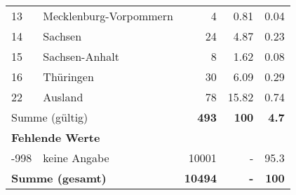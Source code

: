 \begin{longtable}{lXrrr}
     13 &
     \multicolumn{1}{X}{ Mecklenburg-Vorpommern   } &


       \num{4} &
       \num[round-mode=places,round-precision=2]{0.81} &
         \num[round-mode=places,round-precision=2]{0.04} \\

     14 &
     \multicolumn{1}{X}{ Sachsen   } &


       \num{24} &
       \num[round-mode=places,round-precision=2]{4.87} &
         \num[round-mode=places,round-precision=2]{0.23} \\

     15 &
     \multicolumn{1}{X}{ Sachsen-Anhalt   } &


       \num{8} &
       \num[round-mode=places,round-precision=2]{1.62} &
         \num[round-mode=places,round-precision=2]{0.08} \\

     16 &
     \multicolumn{1}{X}{ Thüringen   } &


       \num{30} &
       \num[round-mode=places,round-precision=2]{6.09} &
         \num[round-mode=places,round-precision=2]{0.29} \\

     22 &
     \multicolumn{1}{X}{ Ausland   } &


       \num{78} &
       \num[round-mode=places,round-precision=2]{15.82} &
         \num[round-mode=places,round-precision=2]{0.74} \\
     \midrule
     \multicolumn{2}{l}{Summe (gültig)} &
       \textbf{\num{493}} &
     \textbf{\num{100}} &
       \textbf{\num[round-mode=places,round-precision=2]{4.7}} \\
     \multicolumn{5}{l}{\textbf{Fehlende Werte}}\\
       -998 &
       keine Angabe &
         \num{10001} &
        - &
         \num[round-mode=places,round-precision=2]{95.3} \\
     \midrule
     \multicolumn{2}{l}{\textbf{Summe (gesamt)}} &
          \textbf{\num{10494}} &
        \textbf{-} &
        \textbf{\num{100}} \\
     \bottomrule
     \end{longtable}
     
